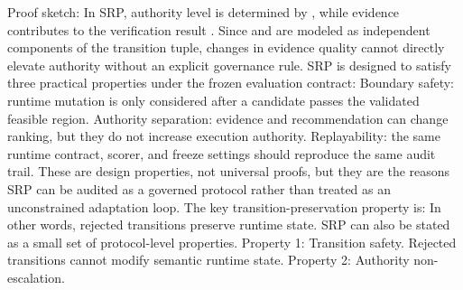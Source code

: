 {}Proof sketch: In SRP, authority level is determined by , while evidence contributes to the verification result . Since  and  are modeled as independent components of the transition tuple, changes in evidence quality cannot directly elevate authority without an explicit governance rule.\markdownRendererInterblockSeparator
{}
\markdownRendererSectionEnd \markdownRendererSectionBegin
{}\markdownRendererInterblockSeparator
{}SRP is designed to satisfy three practical properties under the frozen evaluation contract:\markdownRendererInterblockSeparator
{}\markdownRendererUlBeginTight
\markdownRendererUlItem Boundary safety: runtime mutation is only considered after a candidate passes the validated feasible region.\markdownRendererUlItemEnd 
\markdownRendererUlItem Authority separation: evidence and recommendation can change ranking, but they do not increase execution authority.\markdownRendererUlItemEnd 
\markdownRendererUlItem Replayability: the same runtime contract, scorer, and freeze settings should reproduce the same audit trail.\markdownRendererUlItemEnd 
\markdownRendererUlEndTight \markdownRendererInterblockSeparator
{}These are design properties, not universal proofs, but they are the reasons SRP can be audited as a governed protocol rather than treated as an unconstrained adaptation loop.\markdownRendererParagraphSeparator
{}The key transition-preservation property is:\markdownRendererInterblockSeparator
{}\markdownRendererInterblockSeparator
{}In other words, rejected transitions preserve runtime state.\markdownRendererInterblockSeparator
{}
\markdownRendererSectionEnd \markdownRendererSectionBegin
{}\markdownRendererInterblockSeparator
{}SRP can also be stated as a small set of protocol-level properties.\markdownRendererParagraphSeparator
{}Property 1: Transition safety.\markdownRendererInterblockSeparator
{}\markdownRendererInterblockSeparator
{}Rejected transitions cannot modify semantic runtime state.\markdownRendererParagraphSeparator
{}Property 2: Authority non-escalation.\markdownRendererInterblockSeparator
{}\markdownRendererInterblockSeparator

